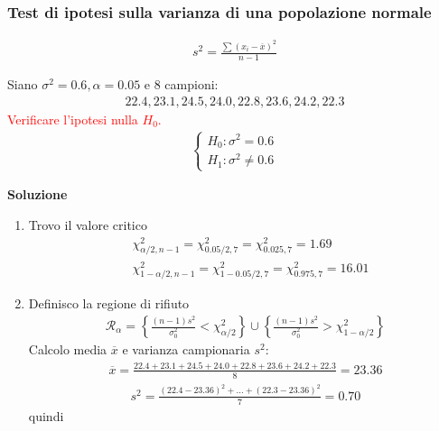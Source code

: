 \documentclass{article}  %
\theoremstyle{definition}
\begin{document}
\subsubsection{Test di ipotesi sulla varianza di una popolazione normale}
\begin{osservazioni}
	\begin{align*}
		s^2=\frac{\sum(x_i - \overline{x})^2}{n-1}
	\end{align*}
\end{osservazioni}
\begin{esercizio}
	Siano $\sigma^2=0.6, \alpha=0.05$ e 8 campioni:
	\begin{align*}
		22.4, 23.1, 24.5, 24.0, 22.8, 23.6, 24.2, 22.3
	\end{align*}
	\textcolor{red}{Verificare l'ipotesi nulla $H_0$.}
	\begin{align*}
		\begin{cases}
			H_0: \sigma^2 = 0.6 \\
			H_1: \sigma^2 \neq 0.6
		\end{cases}
	\end{align*}
	\begin{center}
		\textbf{Soluzione}
	\end{center}
	\begin{enumerate}
		\item Trovo il valore critico
		\begin{align*}
			&\chi^2_{\alpha/2, n-1} = \chi^2_{0.05/2, 7} = \chi^2_{0.025, 7} = 1.69 \\
			&\chi^2_{1-\alpha/2, n-1} = \chi^2_{1-0.05/2, 7} = \chi^2_{0.975, 7} = 16.01
		\end{align*}
		\item Definisco la regione di rifiuto
		\begin{align*}
			 \mathcal{R}_{\alpha} = \left\{\frac{(n-1)s^2}{\sigma^2_0} < \chi^2_{\alpha/2} \right\} \cup \left\{\frac{(n-1)s^2}{\sigma^2_0} > \chi^2_{1-\alpha/2} \right\}
		\end{align*}
		Calcolo media $\overline{x}$ e varianza campionaria $s^2$:
		\begin{align*}
			\overline{x} = \frac{22.4+23.1+24.5+24.0+22.8+23.6+24.2+22.3}{8} = 23.36
		\end{align*}
		\begin{align*}
			s^2 = \frac{(22.4-23.36)^2+ \dots + (22.3-23.36)^2}{7} = 0.70 
		\end{align*}
		quindi
		\begin{align*}

\end{align*}
\end{enumerate}
\end{esercizio}
\end{document}
